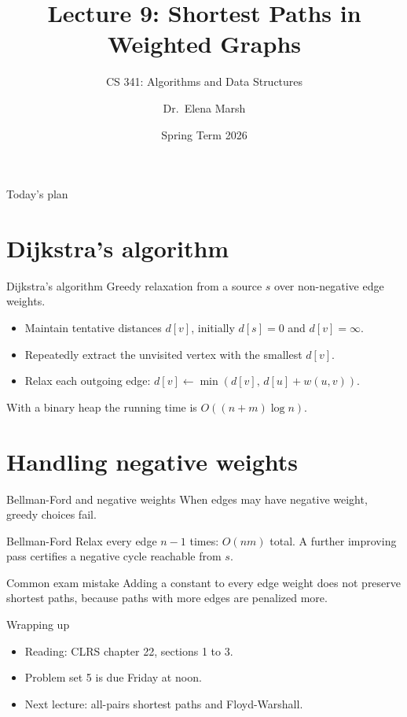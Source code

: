 \documentclass[aspectratio=169]{beamer}
\title[Shortest Paths]{Lecture 9: Shortest Paths in Weighted Graphs}
\subtitle{CS 341: Algorithms and Data Structures}
\author[E. Marsh]{Dr.\ Elena Marsh}
\institute[Rivergate]{Department of Computer Science, Rivergate University}
\date{Spring Term 2026}
\begin{document}
\begin{frame}
  \titlepage
\end{frame}

\begin{frame}{Today's plan}
  \tableofcontents
\end{frame}

\section{Dijkstra's algorithm}

\begin{frame}{Dijkstra's algorithm}
  Greedy relaxation from a source $s$ over non-negative edge weights.
  \begin{itemize}
    \item Maintain tentative distances $d[v]$, initially $d[s] = 0$ and $d[v] = \infty$.
    \item Repeatedly extract the unvisited vertex with the smallest $d[v]$.
    \item Relax each outgoing edge: $d[v] \leftarrow \min(d[v],\, d[u] + w(u, v))$.
  \end{itemize}
  With a binary heap the running time is $O((n + m)\log n)$.
\end{frame}

\section{Handling negative weights}

\begin{frame}{Bellman-Ford and negative weights}
  When edges may have negative weight, greedy choices fail.
  \begin{block}{Bellman-Ford}
    Relax every edge $n - 1$ times: $O(nm)$ total. A further improving pass
    certifies a negative cycle reachable from $s$.
  \end{block}
  \begin{alertblock}{Common exam mistake}
    Adding a constant to every edge weight does not preserve shortest paths,
    because paths with more edges are penalized more.
  \end{alertblock}
\end{frame}

\begin{frame}{Wrapping up}
  \begin{itemize}
    \item Reading: CLRS chapter 22, sections 1 to 3.
    \item Problem set 5 is due Friday at noon.
    \item Next lecture: all-pairs shortest paths and Floyd-Warshall.
  \end{itemize}
\end{frame}
\end{document}

